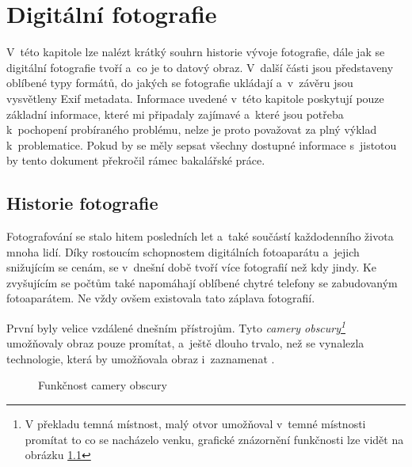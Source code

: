 \chapter{Digitální fotografie}
\label{Digi_foto}
V~této kapitole lze nalézt krátký souhrn historie vývoje fotografie, dále jak se digitální fotografie tvoří a~co je to datový obraz. V~další části jsou představeny oblíbené typy formátů, do jakých se fotografie ukládají a~v~závěru jsou vysvětleny Exif metadata. Informace uvedené v~této kapitole poskytují pouze základní informace, které mi připadaly zajímavé a~které jsou potřeba k~pochopení probíraného problému, nelze je proto považovat za plný výklad k~problematice. Pokud by se měly sepsat všechny dostupné informace s~jistotou by tento dokument překročil rámec bakalářské práce.

\section{Historie fotografie}
Fotografování se stalo hitem posledních let a~také součástí každodenního života mnoha lidí. Díky rostoucím schopnostem digitálních fotoaparátu a~jejich snižujícím se cenám, se v~dnešní době tvoří více fotografií než kdy jindy. Ke zvyšujícím se počtům také napomáhají oblíbené chytré telefony se zabudovaným fotoaparátem. Ne vždy ovšem existovala tato záplava fotografií.

První  byly velice vzdálené dnešním přístrojům. Tyto \textit{camery obscury\footnote{V překladu temná místnost, malý otvor umožňoval v~temné místnosti promítat to co se nacházelo venku, grafické znázornění funkčnosti lze vidět na obrázku \ref{camera_obs_obraz}}} umožňovaly obraz pouze promítat, a~ještě dlouho trvalo, než se vynalezla technologie, která by umožňovala obraz i~zaznamenat \cite{camera_obscura}.

\begin{figure}[h]
\begin{center}
\caption{Funkčnost camery obscury \cite{obrazky_historie}}
\label{camera_obs_obraz}
\end{center}
\end{figure}

